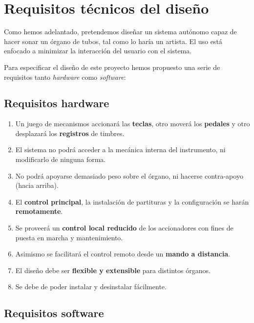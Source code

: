 \chapter{Requisitos técnicos del diseño}
\label{cap:capitulo_2}

Como hemos adelantado, pretendemos diseñar un sistema autónomo capaz de hacer sonar un órgano de tubos, tal como lo haría un artista. El uso está enfocado a minimizar la interacción del usuario con el sistema. 

Para especificar el diseño de este proyecto hemos propuesto una serie de requisitos tanto \textit{hardware} como \textit{software}:

\section{Requisitos hardware}

\begin{enumerate}
	
	\item Un juego de mecanismos accionará las \textbf{teclas}, otro moverá los \textbf{pedales} y otro desplazará los \textbf{registros} de timbres.
	
	\item El sistema no podrá acceder a la mecánica interna del instrumento, ni modificarlo de ninguna forma.
	
	\item No podrá apoyarse demasiado peso sobre el órgano, ni hacerse contra-apoyo (hacia arriba).
	
	\item El \textbf{control principal}, la instalación de partituras y la configuración se harán \textbf{remotamente}.
	
	\item Se proveerá un \textbf{control local reducido} de los accionadores con fines de puesta en marcha y mantenimiento.
	
	\item Asimismo se facilitará el control remoto desde un \textbf{mando a distancia}.
	
	\item El diseño debe ser \textbf{flexible y extensible} para distintos órganos.
	
	\item Se debe de poder instalar y desinstalar fácilmente.
	
\end{enumerate}

\section{Requisitos software}


